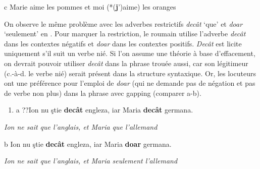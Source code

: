   c  Marie aime les pommes et moi (*(\textbf{j}')aime) les oranges

On observe le même problème avec les adverbes restrictifs \textit{decât} `que' et \textit{doar} `seulement' en . Pour marquer la restriction, le roumain utilise l'adverbe \textit{decât} dans les contextes négatifs et \textit{doar} dans les contextes positifs. \textit{Decât} est licite uniquement s'il suit un verbe nié. Si l'on assume une théorie à base d'effacement, on devrait pouvoir utiliser \textit{decât} dans la phrase trouée aussi, car son légitimeur (c.-à-d. le verbe nié) serait présent dans la structure syntaxique. Or, les locuteurs ont une préférence pour l'emploi de \textit{doar} (qui ne demande pas de négation et pas de verbe non plus) dans la phrase avec gapping (comparer a-b). 


\begin{enumerate}
\item \label{bkm:Ref289810324}a  ??Ion nu ştie \textbf{decât} engleza, iar Maria \textbf{decât} germana.


\end{enumerate}
{\itshape
Ion ne sait que l'anglais, et Maria que l'allemand}

  b  Ion nu ştie \textbf{decât} engleza, iar Maria \textbf{doar} germana.

{\itshape
Ion ne sait que l'anglais, et Maria seulement l'allemand} 

